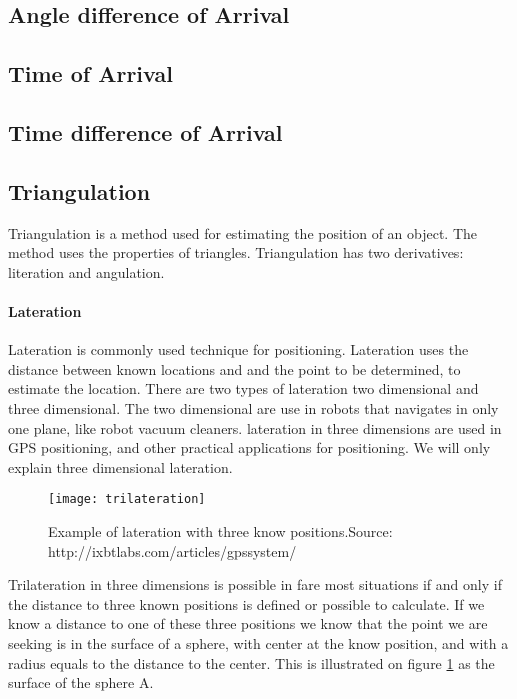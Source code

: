   \subsection{Angle difference of Arrival}

  \subsection{Time of Arrival}

  \subsection{Time difference of Arrival}

  \subsection{Triangulation}

  Triangulation is a method used for estimating the position of an object. The method uses the properties of triangles. Triangulation has two derivatives: literation and angulation.

 \paragraph{Lateration}

  Lateration is commonly used technique for positioning.  Lateration uses the distance between known locations and and the point to be determined, to estimate the location.\cite{tri_lateration}  There are two types of lateration two dimensional and three dimensional. The two dimensional are use in robots that navigates in only one plane, like robot vacuum cleaners. 
  lateration in three dimensions are used in GPS positioning, and other practical applications for positioning.
  We will only explain three dimensional lateration.
  \begin{figure}[h!]
  \centering
  \texttt{[image: trilateration]}
  \caption{Example of lateration with three know positions.\newline Source: http://ixbtlabs.com/articles/gpssystem/}
  \label{fig:trilateration}
  \end{figure}
  

  Trilateration in three dimensions is possible in fare most situations if and only if the distance to three known positions is defined or possible to calculate.
  If we know a distance to one of these three positions we know that the point we are seeking is in the surface of a sphere, with center at the know position, and with a radius equals to the distance to the center. This is illustrated on figure \ref{fig:trilateration} as the surface of the sphere A.

